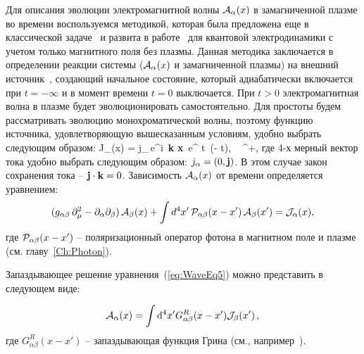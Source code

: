 Для описания эволюции электромагнитной волны ${\cal A}_{\alpha}(x)$  в замагниченной плазме
во времени воспользуемся методикой, которая была предложена еще в классической 
задаче~\cite{Landau:1946} и развита  в работе~\cite{MikhChist:2001} для 
квантовой электродинамики с учетом только магнитного поля без плазмы. Данная 
методика заключается в определении реакции системы 
(${\cal A}_{\alpha}(x)$ и замагниченной плазмы) на внешний источник~\cite{Kirzhnits:1987}, создающий начальное состояние, который адиабатически включается 
при $t = - \infty$ и в момент времени $t = 0$ выключается. При $t > 0$
электромагнитная волна в плазме будет эволюционировать самостоятельно. Для простоты будем рассматривать эволюцию монохроматической волны, поэтому 
функцию источника, удовлетворяющую вышесказанным условиям, удобно выбрать следующим образом:
%
\beq
{\cal J}_{\alpha}(x) = j_{\alpha}\,e^{i \,{\bf k} {\bf x}}\,
e^{ \varepsilon t}\, \theta(- t), \,\,\, \varepsilon {}^+,
\label{eq:1}
\eeq
где 4-х мерный вектор тока удобно выбрать следующим образом: $j_{\alpha} = (0, {\bf j})$. В этом случае закон сохранения тока -- ${\bf j} \cdot {\bf k} = 0$. Зависимость ${\cal A}_{\alpha}(x)$ от 
времени  определяется уравнением:
%
\begin{eqnarray}\label{eq:WaveEq5}
(g_{\alpha \beta} \, \partial_{\mu}^2  -
\partial_{\alpha}\partial_{\beta}) \, {\cal A}_{\beta}(x) + 
\int d^4 x'\, {\cal P}_{\alpha \beta} (x - x') \, {\cal A}_{\beta}(x')
= {\cal J}_{\alpha}(x),
\label{eq:2}
\end{eqnarray}
где ${\cal P}_{\alpha \beta} (x - x')$ -- поляризационный оператор фотона в 
магнитном поле и плазме (см. главу~\ref{Ch:Photon}).



Запаздывающее решение уравнения~(\ref{eq:WaveEq5}) можно представить в 
следующем виде:

\begin{equation}\label{eq:RetSol}
	{\cal A}_\alpha(x)=\int \mathrm{d}^4 x' G^R_{\alpha \beta}(x-x'){\cal J}_\beta(x')\, ,
\end{equation}
где $G^R_{\alpha \beta}(x-x')$ -- запаздывающая функция Грина (см., например~\cite{Landau:2001}).

